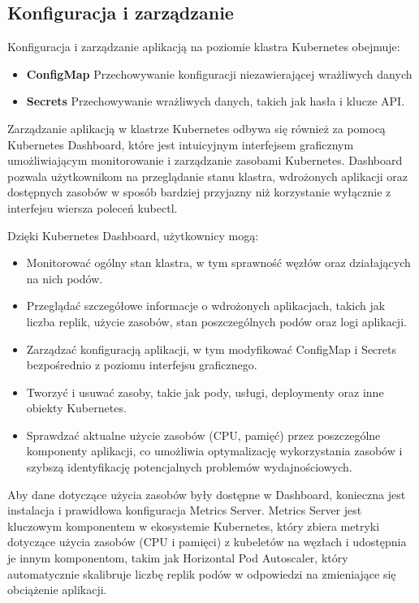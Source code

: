 \documentclass[12pt,a4paper]{article}
\begin{document}
\subsection{Konfiguracja i zarządzanie}
\label{sec:NonFunctionalConditions}

Konfiguracja i zarządzanie aplikacją na poziomie klastra Kubernetes obejmuje:
\begin{itemize}
    \item \textbf{ConfigMap} Przechowywanie konfiguracji niezawierającej wrażliwych danych
    \item \textbf{Secrets} Przechowywanie wrażliwych danych, takich jak hasła i klucze API.
\end{itemize}

Zarządzanie aplikacją w klastrze Kubernetes odbywa się również za pomocą Kubernetes Dashboard, które jest intuicyjnym interfejsem graficznym umożliwiającym monitorowanie i zarządzanie zasobami Kubernetes. Dashboard pozwala użytkownikom na przeglądanie stanu klastra, wdrożonych aplikacji oraz dostępnych zasobów w sposób bardziej przyjazny niż korzystanie wyłącznie z interfejsu wiersza poleceń kubectl.

Dzięki Kubernetes Dashboard, użytkownicy mogą:
\begin{itemize}
\item Monitorować ogólny stan klastra, w tym sprawność węzłów oraz działających na nich podów.
\item Przeglądać szczegółowe informacje o wdrożonych aplikacjach, takich jak liczba replik, użycie zasobów, stan poszczególnych podów oraz logi aplikacji.
\item Zarządzać konfiguracją aplikacji, w tym modyfikować ConfigMap i Secrets bezpośrednio z poziomu interfejsu graficznego.
\item Tworzyć i usuwać zasoby, takie jak pody, usługi, deploymenty oraz inne obiekty Kubernetes.
\item Sprawdzać aktualne użycie zasobów (CPU, pamięć) przez poszczególne komponenty aplikacji, co umożliwia optymalizację wykorzystania zasobów i szybszą identyfikację potencjalnych problemów wydajnościowych.
\end{itemize}

Aby dane dotyczące użycia zasobów były dostępne w Dashboard, konieczna jest instalacja i prawidłowa konfiguracja Metrics Server. Metrics Server jest kluczowym komponentem w ekosystemie Kubernetes, który zbiera metryki dotyczące użycia zasobów (CPU i pamięci) z kubeletów na węzłach i udostępnia je innym komponentom, takim jak Horizontal Pod Autoscaler, który automatycznie skalibruje liczbę replik podów w odpowiedzi na zmieniające się obciążenie aplikacji.
\end{document}
